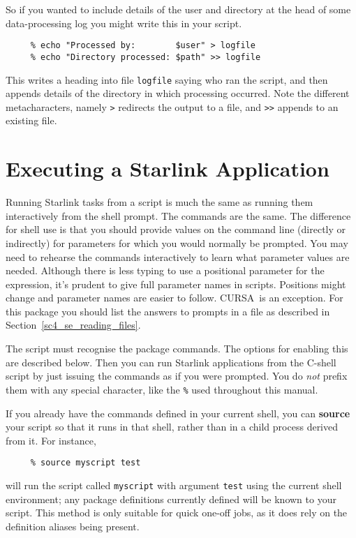 \documentclass[twoside,11pt]{article}
\newcommand{\htmlref}[2]{#1}
\newcommand{\xref}[3]{#1}
\newcommand{\xlabel}[1]{}
\newcommand{\latexelsehtml}[2]{#1}
\newcommand{\latexelsehtml}[2]{#2}
\newcommand{\CURSAref}{\xref{{\footnotesize CURSA}}{sun190}{}}
\begin{document}
So if you wanted to include details of the user and directory at the
head of some data-processing log you might write this in your script.

\small
\begin{verbatim}
     % echo "Processed by:        $user" > logfile
     % echo "Directory processed: $path" >> logfile
\end{verbatim}
\normalsize
This writes a heading into file {\tt logfile} saying who ran the
script, and then appends details of the directory in which processing
occurred. Note the different \htmlref{{\sf metacharacters}}{sc4_gl_met},
namely {\tt >} redirects the output to a file, and {\tt >>} appends to
an existing file.

\newpage
\section{\xlabel{sc4_se_starlink_app}Executing a Starlink Application
\label{sc4_se_starlink_app}}

Running Starlink tasks from a script is much the same as running them
interactively from the shell prompt.  The commands are the same.  The
difference for shell use is that you should provide values on the
command line (directly or indirectly) for parameters for which you
would normally be prompted.  You may need to rehearse the commands
interactively to learn what parameter values are needed.
Although there is less typing to use a positional parameter for the
expression, it's prudent to give full parameter names in scripts.
Positions might change and parameter names are easier to follow.
\CURSAref\ is an exception.  For this package you should list the
answers to prompts in a file as described in
\latexelsehtml{Section~\ref{sc4_se_reading_files}.}{\htmlref{reading
dynamic text files}{sc4_se_reading_files}.}

The script must recognise the package commands.  The options for
enabling this are described below.  Then you can run Starlink
applications from the C-shell script by just issuing the commands as if
you were prompted.  You do {\em not} prefix them with any special
character, like the {\tt \%} used throughout this manual.

If you already have the commands defined in your current shell, you
can {\bf source} your script so that it runs in that shell, rather than
in a child \htmlref{{\sf process}}{sc4_gl_pro} derived from it.  For instance,

\small
\begin{verbatim}
     % source myscript test
\end{verbatim}
\normalsize
will run the script called {\tt myscript} with argument {\tt test} using
the current shell environment; any package definitions currently
defined will be known to your script.  This method is only suitable
for quick one-off jobs, as it does rely on the definition aliases being
present.
\end{document}

